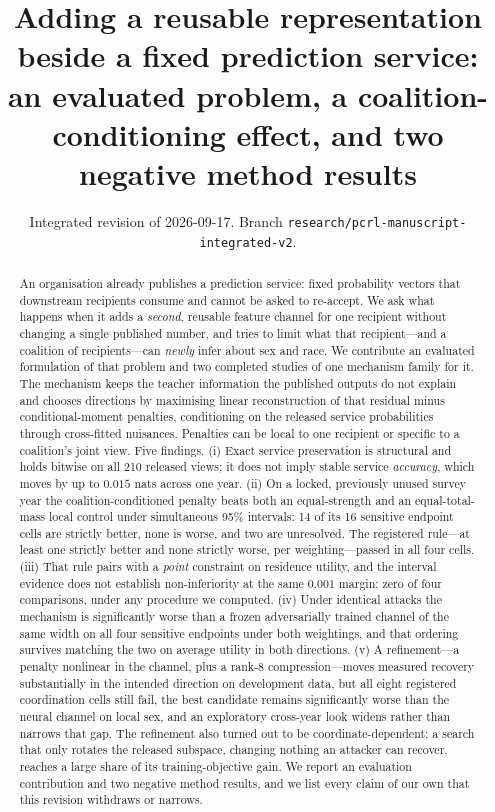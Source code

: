 \documentclass[10pt]{article}
\title{Adding a reusable representation beside a fixed prediction service:\\
an evaluated problem, a coalition-conditioning effect, and two negative method results}
\author{}
\date{Integrated revision of 2026-09-17.
Branch \texttt{research/pcrl-manuscript-integrated-v2}.}
\begin{document}
\maketitle

\begin{abstract}
An organisation already publishes a prediction service: fixed probability vectors that downstream
recipients consume and cannot be asked to re-accept. We ask what happens when it adds a
\emph{second}, reusable feature channel for one recipient without changing a single published
number, and tries to limit what that recipient---and a coalition of recipients---can \emph{newly}
infer about sex and race. We contribute an evaluated formulation of that problem and two completed
studies of one mechanism family for it. The mechanism keeps the teacher information the published
outputs do not explain and chooses directions by maximising linear reconstruction of that residual
minus conditional-moment penalties, conditioning on the released service probabilities through
cross-fitted nuisances. Penalties can be local to one recipient or specific to a coalition's joint
view. Five findings. (i) Exact service preservation is structural and holds bitwise on all 210
released views; it does not imply stable service \emph{accuracy}, which moves by up to $0.015$ nats
across one year. (ii) On a locked, previously unused survey year the coalition-conditioned penalty
beats both an equal-strength and an equal-total-mass local control under simultaneous 95\%
intervals: 14 of its 16 sensitive endpoint cells are strictly better, none is worse, and two are
unresolved. The registered rule---at least one strictly better and none strictly worse, per
weighting---passed in all four cells. (iii) That rule pairs with a \emph{point} constraint on
residence utility, and the interval evidence does not establish non-inferiority at the same
$0.001$ margin: zero of four comparisons, under any procedure we computed. (iv) Under identical
attacks the mechanism is significantly worse than a frozen adversarially trained channel of the
same width on all four sensitive endpoints under both weightings, and that ordering survives
matching the two on average utility in both directions. (v) A refinement---a penalty nonlinear in
the channel, plus a rank-8 compression---moves measured recovery substantially in the intended
direction on development data, but all eight registered coordination cells still fail, the best
candidate remains significantly worse than the neural channel on local sex, and an exploratory
cross-year look widens rather than narrows that gap. The refinement also turned out to be
coordinate-dependent: a search that only rotates the released subspace, changing nothing an
attacker can recover, reaches a large share of its training-objective gain. We report an
evaluation contribution and two negative method results, and we list every claim of our own that
this revision withdraws or narrows.
\end{abstract}
\end{document}
